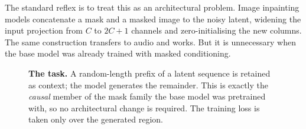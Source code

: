 \documentclass[10pt,twocolumn,letterpaper]{article}
\newcommand{\bm}{\mathbf{m}}
\begin{document}
The standard reflex is to treat this as an architectural problem. Image inpainting
models concatenate a mask and a masked image to the noisy latent, widening the input
projection from $C$ to $2C{+}1$ channels and zero-initialising the new columns. The same
construction transfers to audio and works. But it is unnecessary when the base model was
already trained with masked conditioning.

\begin{figure}[t]
\centering
{}
\caption{\textbf{The task.} A random-length prefix of a latent sequence is retained as
context; the model generates the remainder. This is exactly the \emph{causal} member of
the mask family the base model was pretrained with, so no architectural change is
required. The training loss is taken only over the generated region.}
\label{fig:teaser}
\end{figure}
\end{document}
